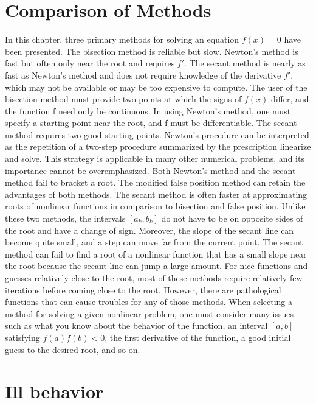 \documentclass[12pt]{article}
\theoremstyle{theorem}
\begin{document}
\cleardoublepage

\section{Comparison of Methods}
In this chapter, three primary methods for solving an equation $f(x)=0$ have been presented. The bisection method is reliable but slow. Newton’s method is fast but often only near the root and requires $f'$. The secant method is nearly as fast as Newton’s method and does not require knowledge of the derivative $f'$, which may not be available or may be too expensive to compute. The user of the bisection method must provide two points at which the signs of $f(x)$ differ, and the function f need only be continuous. In using Newton’s method, one must specify a starting point near the root, and f must be differentiable. The secant method requires two good starting points. Newton’s procedure can be interpreted as the repetition of a two-step procedure summarized by the prescription linearize and solve. This strategy is applicable in many other numerical problems, and its importance cannot be overemphasized. Both Newton’s method and the secant method fail to bracket a root. The modified false position method can retain the advantages of both methods. The secant method is often faster at approximating roots of nonlinear functions in comparison to bisection and false position. Unlike these two methods, the intervals $[a_k, b_k]$ do not have to be on opposite sides of the root and have a change of sign. Moreover, the slope of the secant line can become quite small, and a step can move far from the current point. The secant method can fail to find a root of a nonlinear function that has a small slope near the root because the secant line can jump a large amount. For nice functions and guesses relatively close to the root, most of these methods require relatively few iterations before coming close to the root. However, there are pathological functions that can cause troubles for any of those methods. When selecting a method for solving a given nonlinear problem, one must consider many issues such as what you know about the behavior of the function, an interval $[a,b]$ satisfying $f(a)f(b)<0$, the first derivative of the function, a good initial guess to the desired root, and so on.

\cleardoublepage

\section{Ill behavior}

\newpage

\nocite{*}

 
\end{document}
